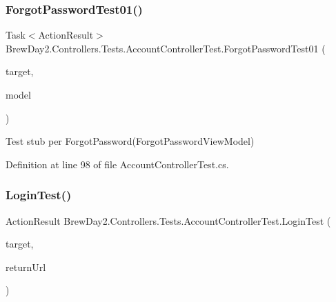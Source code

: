 \mbox{\label{class_brew_day2_1_1_controllers_1_1_tests_1_1_account_controller_test_a4a8f98bcd6c18e26d7bada7911865793}} 
\subsubsection{\texorpdfstring{Forgot\+Password\+Test01()}{ForgotPasswordTest01()}}
{\footnotesize\ttfamily Task$<$Action\+Result$>$ Brew\+Day2.\+Controllers.\+Tests.\+Account\+Controller\+Test.\+Forgot\+Password\+Test01 (\begin{DoxyParamCaption}\item[{\mbox{[}\+Pex\+Assume\+Under\+Test\mbox{]} \mbox{\hyperlink{class_brew_day2_1_1_controllers_1_1_account_controller}{Account\+Controller}}}]{target,  }\item[{\mbox{\hyperlink{class_brew_day2_1_1_models_1_1_forgot_password_view_model}{Forgot\+Password\+View\+Model}}}]{model }\end{DoxyParamCaption})}



Test stub per Forgot\+Password(\+Forgot\+Password\+View\+Model)



Definition at line 98 of file Account\+Controller\+Test.\+cs.

\mbox{\label{class_brew_day2_1_1_controllers_1_1_tests_1_1_account_controller_test_ae6d3cd9f5e2c336f17e7d3ea1f0f9011}} 
\subsubsection{\texorpdfstring{Login\+Test()}{LoginTest()}}
{\footnotesize\ttfamily Action\+Result Brew\+Day2.\+Controllers.\+Tests.\+Account\+Controller\+Test.\+Login\+Test (\begin{DoxyParamCaption}\item[{\mbox{[}\+Pex\+Assume\+Under\+Test\mbox{]} \mbox{\hyperlink{class_brew_day2_1_1_controllers_1_1_account_controller}{Account\+Controller}}}]{target,  }\item[{string}]{return\+Url }\end{DoxyParamCaption})}



